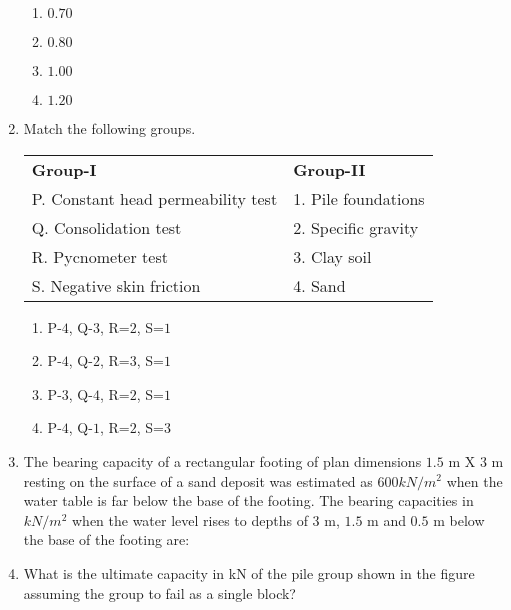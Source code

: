 \documentclass[journal]{IEEEtran}
\begin{document}
\begin{enumerate}[start=35]
	\begin{enumerate}
		\item $0.70$
		\item $0.80$
		\item $1.00$
		\item $1.20$		
	\end{enumerate}
\item Match the following groups.\\
\begin{center}
\begin{tabular}{ll}
    \textbf{Group-I} & \textbf{Group-II} \\
    P. Constant head permeability test & 1. Pile foundations \\
    Q. Consolidation test & 2. Specific gravity \\
    R. Pycnometer test & 3. Clay soil \\
    S. Negative skin friction & 4. Sand \\
\end{tabular}
\end{center}
	\begin{enumerate}
		\item P-$4$, Q-$3$, R=$2$, S=$1$
		\item P-$4$, Q-$2$, R=$3$, S=$1$
		\item P-$3$, Q-$4$, R=$2$, S=$1$
		\item P-$4$, Q-$1$, R=$2$, S=$3$
	\end{enumerate}
\item The bearing capacity of a rectangular footing of plan dimensions $1.5$ m X $3$ m resting on the surface of a sand deposit was estimated as $600 kN/m^2$ when the water table is far below the base of the footing. The bearing capacities in $kN/m^2$ when the water level rises to depths of $3$ m, $1.5$ m and $0.5$ m below the base of the footing are:
	\begin{enumerate} 
	\end{enumerate}
\item What is the ultimate capacity in kN of the pile group shown in the figure assuming the group to fail as a single block?\\

\end{enumerate}
\end{document}
